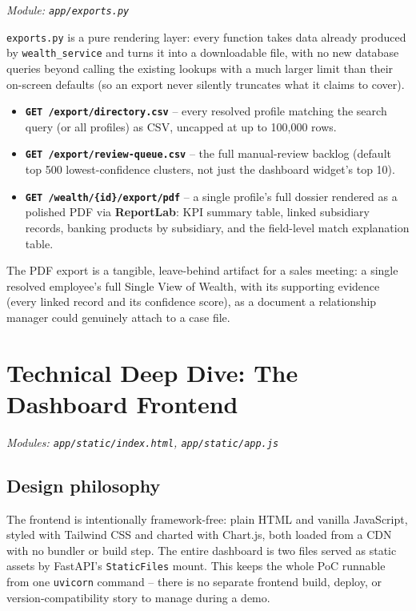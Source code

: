 \documentclass[11pt]{report}
\newcommand{\code}[1]{\lstinline[style=plain]!#1!}
\begin{document}
\textit{Module: \texttt{app/exports.py}}

\code{exports.py} is a pure rendering layer: every function takes data already produced by \texttt{wealth\_service} and turns it into a downloadable file, with no new database queries beyond calling the existing lookups with a much larger limit than their on-screen defaults (so an export never silently truncates what it claims to cover).

\begin{itemize}
\item \textbf{\texttt{GET /export/directory.csv}} -- every resolved profile matching the search query (or all profiles) as CSV, uncapped at up to 100,000 rows.
\item \textbf{\texttt{GET /export/review-queue.csv}} -- the full manual-review backlog (default top 500 lowest-confidence clusters, not just the dashboard widget's top 10).
\item \textbf{\texttt{GET /wealth/\{id\}/export/pdf}} -- a single profile's full dossier rendered as a polished PDF via \textbf{ReportLab}: KPI summary table, linked subsidiary records, banking products by subsidiary, and the field-level match explanation table.
\end{itemize}

\begin{bizbox}
The PDF export is a tangible, leave-behind artifact for a sales meeting: a single resolved employee's full Single View of Wealth, with its supporting evidence (every linked record and its confidence score), as a document a relationship manager could genuinely attach to a case file.
\end{bizbox}

\chapter{Technical Deep Dive: The Dashboard Frontend}
\label{ch:frontend}

\textit{Modules: \texttt{app/static/index.html}, \texttt{app/static/app.js}}

\section{Design philosophy}

The frontend is intentionally framework-free: plain HTML and vanilla JavaScript, styled with Tailwind CSS and charted with Chart.js, both loaded from a CDN with no bundler or build step. The entire dashboard is two files served as static assets by FastAPI's \code{StaticFiles} mount. This keeps the whole PoC runnable from one \code{uvicorn} command -- there is no separate frontend build, deploy, or version-compatibility story to manage during a demo.
\end{document}
